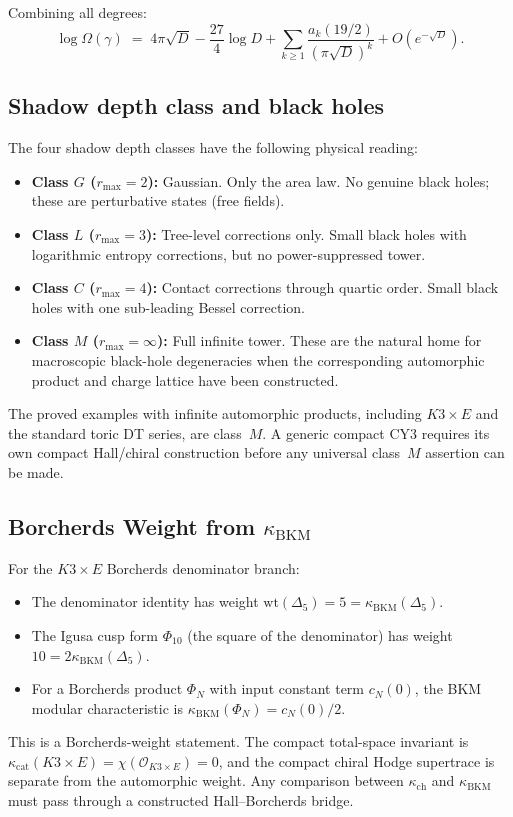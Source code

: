 \documentclass[11pt]{article}
\theoremstyle{definition}
\newcommand{\cO}{\mathcal{O}}
\newcommand{\kBKM}{\kappa_{\mathrm{BKM}}}
\newcommand{\kch}{\kappa_{\mathrm{ch}}}
\newcommand{\kcat}{\kappa_{\mathrm{cat}}}
\begin{document}
\noindent
Combining all degrees:
\[
 \log \Omega(\gamma) \;=\;
 4\pi\sqrt{D} - \frac{27}{4}\log D
 + \sum_{k \geq 1} \frac{a_k(19/2)}{(\pi\sqrt{D})^k}
 + O(e^{-\sqrt{D}}).
\]

\subsection{Shadow depth class and black holes}

The four shadow depth classes have the following physical reading:

\begin{itemize}
 \item \textbf{Class $G$ ($r_{\max} = 2$):}
 Gaussian. Only the area law. No genuine black holes;
 these are perturbative states (free fields).

 \item \textbf{Class $L$ ($r_{\max} = 3$):}
 Tree-level corrections only. Small black holes with
 logarithmic entropy corrections, but no power-suppressed
 tower.

 \item \textbf{Class $C$ ($r_{\max} = 4$):}
 Contact corrections through quartic order. Small black
 holes with one sub-leading Bessel correction.

 \item \textbf{Class $M$ ($r_{\max} = \infty$):}
 Full infinite tower. These are the natural home for macroscopic
 black-hole degeneracies when the corresponding automorphic product
 and charge lattice have been constructed.
\end{itemize}

\noindent
The proved examples with infinite automorphic products, including
$K3\times E$ and the standard toric DT series, are class~$M$. A
generic compact CY3 requires its own compact Hall/chiral construction
before any universal class~$M$ assertion can be made.

\subsection{Borcherds Weight from \texorpdfstring{$\kappa_{\mathrm{BKM}}$}{Borcherds characteristic}}

For the $K3 \times E$ Borcherds denominator branch:
\begin{itemize}
 \item The denominator identity has weight
 $\mathrm{wt}(\Delta_5) = 5 = \kBKM(\Delta_5)$.
 \item The Igusa cusp form $\Phi_{10}$ (the square of the
 denominator) has weight $10 = 2\kBKM(\Delta_5)$.
 \item For a Borcherds product $\Phi_N$ with input constant term
 $c_N(0)$, the BKM modular characteristic is
 $\kBKM(\Phi_N)=c_N(0)/2$.
\end{itemize}
This is a Borcherds-weight statement. The compact total-space invariant is
$\kcat(K3\times E)=\chi(\cO_{K3\times E})=0$, and the compact chiral Hodge
supertrace is separate from the automorphic weight. Any comparison between
$\kch$ and $\kBKM$ must pass through a constructed Hall--Borcherds bridge.
\end{document}
